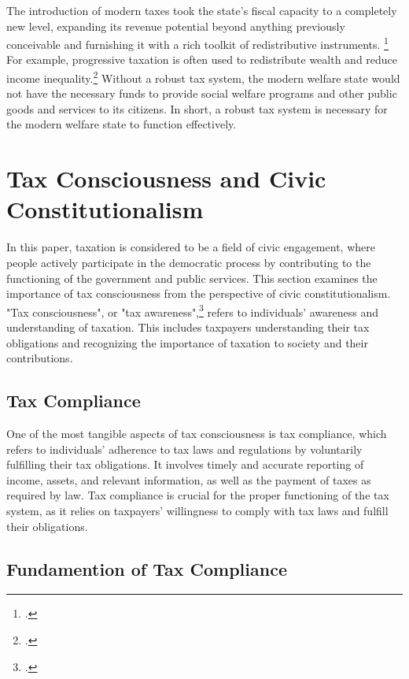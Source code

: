 \documentclass[]{article}
\begin{document}
The introduction of modern taxes took the state’s fiscal capacity to a completely new level, expanding its revenue potential beyond anything previously conceivable and furnishing it with a rich toolkit of redistributive instruments.
\footcite[1]{Genschel2021} For example, progressive taxation is often used to redistribute wealth and reduce income inequality.\footcite{Kato2003}
Without a robust tax system, the modern welfare state would not have the necessary funds to provide social welfare programs and other public goods and services to its citizens. In short, a robust tax system is necessary for the modern welfare state to function effectively. 


\section{Tax Consciousness and Civic Constitutionalism}


In this paper, taxation is considered to be a field of civic engagement, where people actively participate in the democratic process by contributing to the functioning of the government and public services. 
This section examines the importance of tax consciousness from the perspective of civic constitutionalism. "Tax consciousness", or "tax awareness",\footcite[at 237]{Buehler1940} refers to individuals' awareness and understanding of taxation. This includes taxpayers understanding their tax obligations and recognizing the importance of taxation to society and their contributions.

\subsection{Tax Compliance}


One of the most tangible aspects of tax consciousness is tax compliance, which refers to individuals' adherence to tax laws and regulations by voluntarily fulfilling their tax obligations. It involves timely and accurate reporting of income, assets, and relevant information, as well as the payment of taxes as required by law. Tax compliance is crucial for the proper functioning of the tax system, as it relies on taxpayers’ willingness to comply with tax laws and fulfill their obligations. 

\subsection{Fundamention of Tax Compliance}
\end{document}
